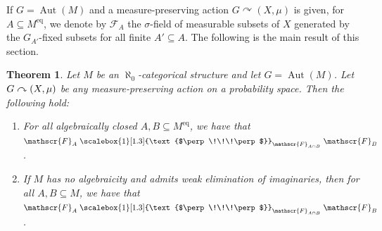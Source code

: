 \documentclass[JEP,XML,SOM,Unicode,published]{cedram}
\let\mathcal\mathscr
\let\actson\curvearrowright
\let\sub\subseteq
\theoremstyle{plain}
\newtheorem{theorem}{Theorem}[section]
\theoremstyle{definition}
\newcommand{\cF}{\mathcal{F}}
\DeclareMathOperator{\Aut}{Aut}
\newcommand{\eq}{^{\mathrm{eq}}}
\newcommand{\indep}[1][]{%
  \mathrel{
    \mathop{
      \scalebox{1}[1.3]{\text{$\perp\!\!\!\perp$}}
    }\displaylimits_{#1}
  }
}
\begin{document}
If $G = \Aut(M)$ and a measure-preserving action $G \actson (X, \mu)$ is given, for $A \sub M\eq$, we denote by $\cF_A$ the $\sigma$-field of measurable subsets of $X$ generated by the $G_{A'}$-fixed subsets for all finite $A' \sub A$. The following is the main result of this section.
\begin{theorem}
\label{th:general-independence}
Let $M$ be an $\aleph_0$-categorical structure and let $G = \Aut(M)$. Let $G \actson\nobreak (X, \mu)$ be any measure-preserving action on a probability space. Then the following hold:
\begin{enumerate}
\item \label{i:thgen:1} For all algebraically closed $A, B \sub M\eq$, we have that $\cF_A \indep[\cF_{A \cap B}] \cF_B$.

\item \label{i:thgen:2} If $M$ has no algebraicity and admits weak elimination of imaginaries, then for all $A, B \sub M$, we have that $\cF_A \indep[\cF_{A \cap B}] \cF_B$.
\end{enumerate}
\end{theorem}
\end{document}
